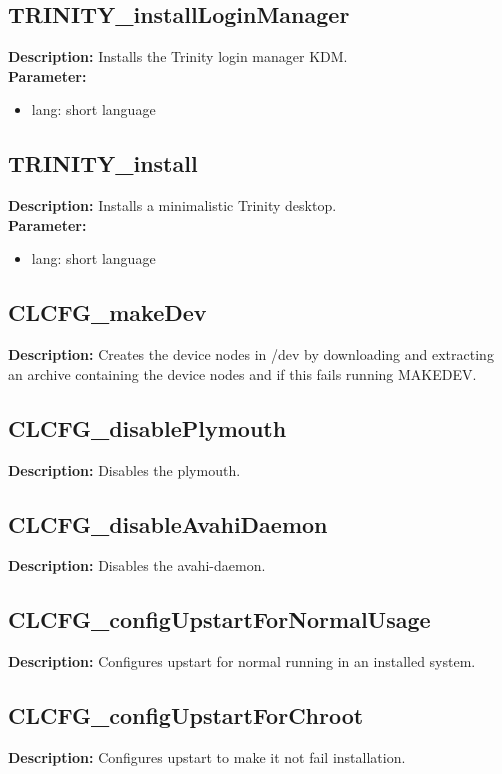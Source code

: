 \subsection{TRINITY\_installLoginManager}
\textbf{Description:} Installs the Trinity login manager KDM.\\
\textbf{Parameter:}
\begin{itemize}
\item lang: short language
\end{itemize}

\subsection{TRINITY\_install}
\textbf{Description:} Installs a minimalistic Trinity desktop.\\
\textbf{Parameter:}
\begin{itemize}
\item lang: short language
\end{itemize}

\subsection{CLCFG\_makeDev}
\textbf{Description:} Creates the device nodes in /dev by downloading and extracting an archive containing the device nodes and if this fails running MAKEDEV.\\

\subsection{CLCFG\_disablePlymouth}
\textbf{Description:} Disables the plymouth.\\

\subsection{CLCFG\_disableAvahiDaemon}
\textbf{Description:} Disables the avahi-daemon.\\

\subsection{CLCFG\_configUpstartForNormalUsage}
\textbf{Description:} Configures upstart for normal running in an installed system.\\

\subsection{CLCFG\_configUpstartForChroot}
\textbf{Description:} Configures upstart to make it not fail installation.\\


